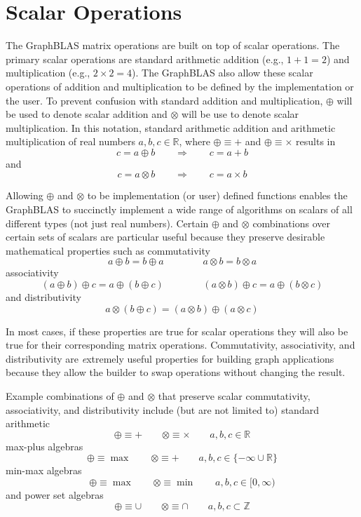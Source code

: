 \section{Scalar Operations}
  The GraphBLAS matrix operations are built on top of scalar operations.  The primary scalar operations are standard arithmetic addition (e.g., $1 + 1 = 2$) and multiplication (e.g., $2 \times 2 = 4$).  The GraphBLAS also allow these scalar operations of addition and multiplication to be defined by the implementation or the user.  To prevent confusion with standard addition and multiplication, $\oplus$ will be used to denote scalar addition and $\otimes$ will be use to denote scalar multiplication.  In this notation, standard arithmetic addition and arithmetic multiplication of real numbers $a, b, c \in \mathbb{R}$, where $\oplus \equiv +$ and $\oplus \equiv \times$ results in
$$
   c = a \oplus b  ~~~~~~~~~ \Rightarrow ~~~~~~~~~ c = a + b
$$
and
$$
   c = a \otimes b  ~~~~~~~~~ \Rightarrow ~~~~~~~~~ c = a \times b
$$

  Allowing $\oplus$ and $\otimes$ to be implementation (or user) defined functions enables the GraphBLAS to succinctly implement a wide range of algorithms on scalars of all different types (not just real numbers).  Certain $\oplus$ and $\otimes$ combinations  over certain sets of scalars are particular useful because they preserve desirable mathematical properties such as commutativity
$$
 a \oplus b = b \oplus a ~~~~~~~~~ ~~~~~~~~~ a \otimes b = b \otimes a
$$
associativity
$$
 (a \oplus b) \oplus c = a \oplus (b \oplus c) ~~~~~~~~~ ~~~~~~~~~ (a \otimes b) \oplus c = a \oplus (b \otimes c)
$$
and distributivity
$$
 a \otimes (b \oplus c)  = (a \otimes b) \oplus (a \otimes c)
$$

  In most cases, if these properties are true for scalar operations they will also be true for their corresponding matrix operations.  Commutativity, associativity, and distributivity are {\emph extremely} useful properties for building graph applications because they allow the builder to swap operations without changing the result.

  Example combinations of $\oplus$ and $\otimes$ that preserve scalar commutativity, associativity, and distributivity include (but are not limited to) standard arithmetic
$$
  \oplus \equiv + ~~~~~~~~~ \otimes \equiv \times ~~~~~~~~~ a, b, c \in \mathbb{R}
$$
max-plus algebras
$$
  \oplus \equiv \max ~~~~~~~~~ \otimes \equiv + ~~~~~~~~~ a, b, c \in \{-\infty \cup \mathbb{R}\}
$$
min-max algebras
$$
  \oplus \equiv \max ~~~~~~~~~ \otimes \equiv \min ~~~~~~~~~ a, b, c \in [0,\infty)
$$
and power set algebras
$$
  \oplus \equiv \cup ~~~~~~~~~ \otimes \equiv \cap ~~~~~~~~~ a, b, c \subset \mathbb{Z}
$$

